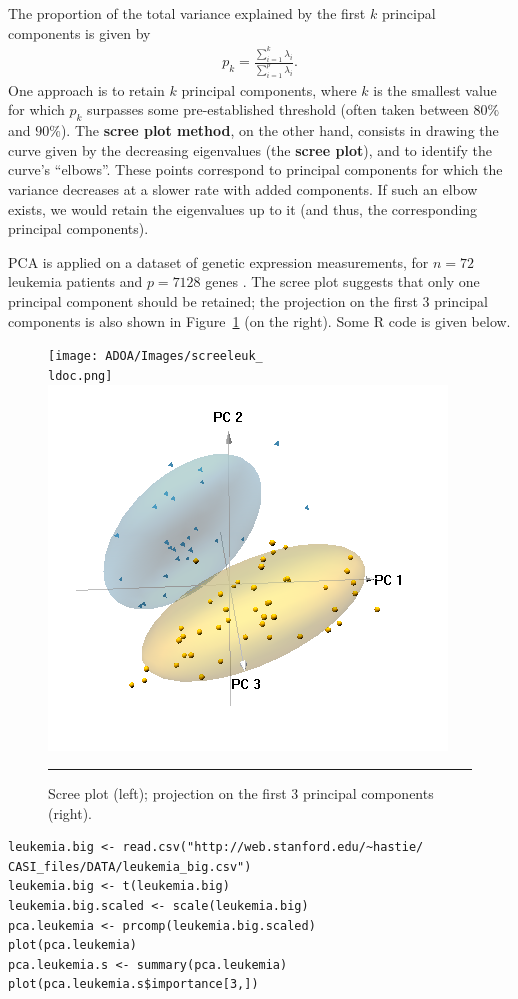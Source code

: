 \newl The proportion of the total variance explained by the first $k$ principal components is given by  
\begin{align*}
p_k=\frac{\sum_{i=1}^{k} \lambda_i}{\sum_{i=1}^{p}\lambda_i}.
\end{align*}
One approach is to retain $k$ principal components, where $k$ is the smallest value for which  $p_k$ surpasses some pre-established threshold  (often taken between $80\%$ and $90\%$). \newl
The \textbf{scree plot method}, on the other hand, consists in drawing the curve given by the decreasing eigenvalues (the \textbf{scree plot}), and to identify the curve's ``elbows''. These points correspond to principal components for which the variance decreases at a slower rate with added components. If such an elbow exists, we would retain the eigenvalues up to it (and thus,  the corresponding principal components). 
\begin{Example}
PCA is applied on a dataset of genetic expression measurements, for $n=72$ leukemia patients and $p=7128$ genes \cite{Hleukemia}. The scree plot suggests that only one principal component should be retained; the projection on the first 3 principal components is also shown in Figure~\ref{fig0} (on the right). Some R code is given below.
\begin{figure}[t]
    \centering
     \texttt{[image: ADOA/Images/screeleuk\_\\ldoc.png]}
    \includegraphics[width=.4\textwidth]{ADOA/Images/3dpcleuk.PNG}
    \caption{Scree plot (left); projection on the first 3 principal components (right).}\hrule
    \label{fig0}
\end{figure}
\begin{lstlisting}
leukemia.big <- read.csv("http://web.stanford.edu/~hastie/ CASI_files/DATA/leukemia_big.csv")
leukemia.big <- t(leukemia.big)
leukemia.big.scaled <- scale(leukemia.big)
pca.leukemia <- prcomp(leukemia.big.scaled)
plot(pca.leukemia)
pca.leukemia.s <- summary(pca.leukemia) 
plot(pca.leukemia.s$importance[3,])
\end{lstlisting}
\end{Example}

